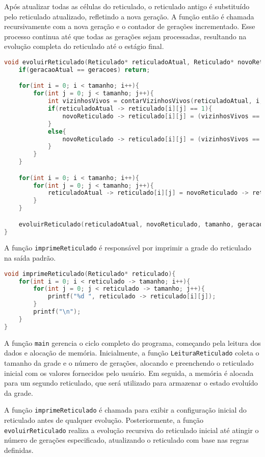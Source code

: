 \documentclass{article}
\begin{document}
Após atualizar todas as células do reticulado, o reticulado antigo é substituído pelo reticulado atualizado, refletindo a nova geração. A função então é chamada recursivamente com a nova geração e o contador de gerações incrementado. Esse processo continua até que todas as gerações sejam processadas, resultando na evolução completa do reticulado até o estágio final.
\begin{lstlisting}[caption={},label={lst:cod1},language=C]
void evoluirReticulado(Reticulado* reticuladoAtual, Reticulado* novoReticulado, int tamanho, int geracaoAtual, int geracoes){
    if(geracaoAtual == geracoes) return;

    for(int i = 0; i < tamanho; i++){
        for(int j = 0; j < tamanho; j++){
            int vizinhosVivos = contarVizinhosVivos(reticuladoAtual, i, j);
            if(reticuladoAtual -> reticulado[i][j] == 1){
                novoReticulado -> reticulado[i][j] = (vizinhosVivos == 2 || vizinhosVivos == 3) ? 1 : 0;
            }
            else{
                novoReticulado -> reticulado[i][j] = (vizinhosVivos == 3) ? 1 : 0;
            }
        }
    }

    for(int i = 0; i < tamanho; i++){
        for(int j = 0; j < tamanho; j++){
            reticuladoAtual -> reticulado[i][j] = novoReticulado -> reticulado[i][j];
        }
    }

    evoluirReticulado(reticuladoAtual, novoReticulado, tamanho, geracaoAtual + 1, geracoes);
}
\end{lstlisting}
A função \verb|imprimeReticulado| é responsável por imprimir a grade do reticulado na saída padrão.  
\begin{lstlisting}[caption={},label={lst:cod1},language=C]
void imprimeReticulado(Reticulado* reticulado){
    for(int i = 0; i < reticulado -> tamanho; i++){
        for(int j = 0; j < reticulado -> tamanho; j++){
            printf("%d ", reticulado -> reticulado[i][j]);
        }
        printf("\n");
    }
}
\end{lstlisting}
A função \verb|main| gerencia o ciclo completo do programa, começando pela leitura dos dados e alocação de memória. Inicialmente, a função \verb|LeituraReticulado| coleta o tamanho da grade e o número de gerações, alocando e preenchendo o reticulado inicial com os valores fornecidos pelo usuário. Em seguida, a memória é alocada para um segundo reticulado, que será utilizado para armazenar o estado evoluído da grade.

A função \verb|imprimeReticulado| é chamada para exibir a configuração inicial do reticulado antes de qualquer evolução. Posteriormente, a função \verb|evoluirReticulado| realiza a evolução recursiva do reticulado inicial até atingir o número de gerações especificado, atualizando o reticulado com base nas regras definidas.
\end{document}
